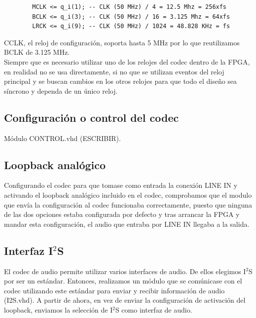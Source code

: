 		\begin{verbatim}
		MCLK <= q_i(1); -- CLK (50 MHz) / 4 = 12.5 Mhz = 256xfs
		BCLK <= q_i(3); -- CLK (50 MHz) / 16 = 3.125 Mhz = 64xfs
		LRCK <= q_i(9); -- CLK (50 MHz) / 1024 = 48.828 KHz = fs
		\end{verbatim} 

CCLK, el reloj de configuración, soporta hasta 5 MHz por lo que reutilizamos BCLK de 3.125 MHz.\\

		Siempre que es necesario utilizar uno de los relojes del codec dentro de la FPGA, en realidad no se usa directamente, si no que se utilizan eventos del reloj principal y se buscan cambios en los otros relojes para que todo el diseño sea síncrono y dependa de un único reloj.






	\subsection{Configuración o control del codec}

		Módulo CONTROL.vhd \textcolor{rosa}{(ESCRIBIR)}.

	
 
	\subsection{Loopback analógico}

		Configurando el codec para que tomase como entrada la conexión LINE IN y activando el loopback analógico incluido en el codec, comprobamos que el modulo que envía la configuración al codec funcionaba correctamente, puesto que ninguna de las dos opciones estaba configurada por defecto y tras arrancar la FPGA y mandar esta configuración, el audio que entraba por LINE IN llegaba a la salida.
		
	
	\subsection{Interfaz I$^2$S}

		El codec de audio permite utilizar varios interfaces de audio. De ellos elegimos I$^2$S por ser un estándar. Entonces, realizamos un módulo que se comúnicase con el codec utilizando este estándar para enviar y recibir información de audio (I2S.vhd). A partir de ahora, en vez de enviar la configuración de activación del loopback, enviamos la selección de I$^2$S como interfaz de audio.

